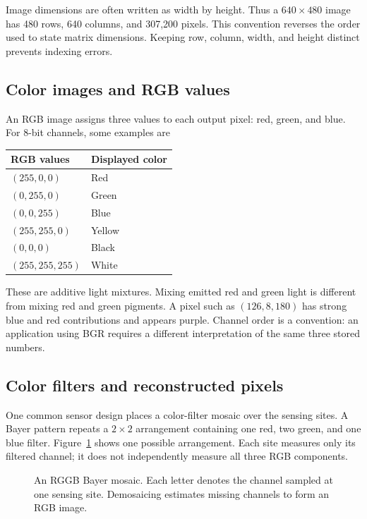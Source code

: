 Image dimensions are often written as width by height. Thus a
$640\times480$ image has 480 rows, 640 columns, and 307,200 pixels.
This convention reverses the order used to state matrix dimensions.
Keeping row, column, width, and height distinct prevents indexing errors.

\subsection{Color images and RGB values}
An RGB image assigns three values to each output pixel: red, green, and blue.
For 8-bit channels, some examples are
\begin{center}
\begin{tabular}{ll}
\toprule
RGB values & Displayed color\\
\midrule
$(255,0,0)$ & Red\\
$(0,255,0)$ & Green\\
$(0,0,255)$ & Blue\\
$(255,255,0)$ & Yellow\\
$(0,0,0)$ & Black\\
$(255,255,255)$ & White\\
\bottomrule
\end{tabular}
\end{center}
These are additive light mixtures. Mixing emitted red and green light is
different from mixing red and green pigments. A pixel such as
$(126,8,180)$ has strong blue and red contributions and appears purple.
Channel order is a convention: an application using BGR requires a different
interpretation of the same three stored numbers.

\subsection{Color filters and reconstructed pixels}
One common sensor design places a color-filter mosaic over the sensing
sites. A Bayer pattern repeats a $2\times2$ arrangement containing one red,
two green, and one blue filter. Figure~\ref{fig:l07-bayer} shows one possible
arrangement. Each site measures only its filtered channel; it does not
independently measure all three RGB components.

\begin{figure}[htbp]
\centering
\caption{An RGGB Bayer mosaic. Each letter denotes the channel sampled at
one sensing site. Demosaicing estimates missing channels to form an RGB image.}
\label{fig:l07-bayer}
\end{figure}

